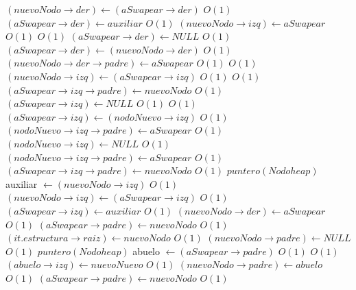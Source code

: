 \begin{Algoritmos}
\begin{algorithmic}[1]
									\State $(nuevoNodo \rightarrow der) \gets (aSwapear \rightarrow der)$ \Comment $O(1)$
									\State $(aSwapear \rightarrow der) \gets auxiliar$ \Comment $O(1)$
								\EndIf
							\EndIf
						\State $(nuevoNodo \rightarrow izq) \gets aSwapear$ \Comment $O(1)$
					\Else
						 \Comment $O(1)$
								\State $(aSwapear \rightarrow der) \gets NULL$ \Comment $O(1)$
							\Else
								\State $(aSwapear \rightarrow der) \gets (nuevoNodo \rightarrow der)$ \Comment $O(1)$
								\State $(nuevoNodo \rightarrow der \rightarrow padre) \gets aSwapear$ \Comment $O(1)$
							\EndIf
							 \Comment $O(1)$
								\State $(nuevoNodo \rightarrow izq) \gets (aSwapear \rightarrow izq)$ \Comment $O(1)$
								 \Comment $O(1)$
									\State $(aSwapear \rightarrow izq \rightarrow padre) \gets nuevoNodo$	\Comment $O(1)$						
								\EndIf
								\State $(aSwapear \rightarrow izq) \gets NULL$ \Comment $O(1)$
							\Else
								 \Comment $O(1)$
									\State $(aSwapear \rightarrow izq) \gets (nodoNuevo \rightarrow izq)$ \Comment $O(1)$
									\State $(nodoNuevo \rightarrow izq \rightarrow padre) \gets aSwapear$ \Comment $O(1)$
									\State $(nodoNuevo \rightarrow izq) \gets NULL$ \Comment $O(1)$
								\Else
									\State $(nodoNuevo \rightarrow izq \rightarrow padre) \gets aSwapear$ \Comment $O(1)$
									\State $(aSwapear \rightarrow izq \rightarrow padre) \gets nuevoNodo$ \Comment $O(1)$
									\State $puntero(Nodoheap)$ auxiliar $\gets (nuevoNodo \rightarrow izq)$ \Comment $O(1)$
									\State $(nuevoNodo \rightarrow izq) \gets (aSwapear \rightarrow izq)$ \Comment $O(1)$
									\State $(aSwapear \rightarrow izq) \gets auxiliar$ \Comment $O(1)$
								\EndIf
							\EndIf
						\State $(nuevoNodo \rightarrow der) \gets aSwapear$ \Comment $O(1)$
					\EndIf	
					\State $(aSwapear \rightarrow padre) \gets nuevoNodo$ \Comment $O(1)$
					\State $(it.estructura \rightarrow raiz) \gets nuevoNodo$	 \Comment $O(1)$
					\State $(nuevoNodo \rightarrow padre) \gets NULL$			 \Comment $O(1)$
					\Else
					\State $puntero(Nodoheap)$ abuelo $\gets (aSwapear \rightarrow padre)$ \Comment $O(1)$
						 \Comment $O(1)$
							\State $(abuelo \rightarrow izq) \gets nuevoNuevo$ \Comment $O(1)$
							\State $(nuevoNodo \rightarrow padre) \gets abuelo$ \Comment $O(1)$
							\State $(aSwapear \rightarrow padre) \gets nuevoNodo$ \Comment $O(1)$

\end{algorithmic}
\end{Algoritmos}
